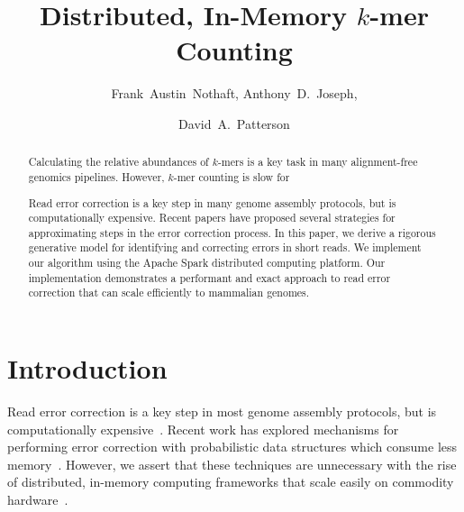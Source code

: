 \documentclass{llncs}
\begin{document}
%
\frontmatter          %
%
\pagestyle{headings}  %
\mainmatter              %
%
\title{Distributed, In-Memory $k$-mer Counting}
%
%
\author{Frank~Austin~Nothaft, Anthony~D.~Joseph, \and David~A.~Patterson}
%
%

\maketitle              %

\begin{abstract}
Calculating the relative abundances of $k$-mers is a key task in many alignment-free genomics
pipelines. However, $k$-mer counting is slow for 

Read error correction is a key step in many genome assembly protocols, but is computationally
expensive. Recent papers have proposed several strategies for approximating steps in the error
correction process. In this paper, we derive a rigorous generative model for identifying and correcting
errors in short reads. We implement our algorithm using the Apache Spark distributed computing
platform. Our implementation demonstrates a performant and exact approach to read error correction
that can scale efficiently to mammalian genomes.

\end{abstract}

\section{Introduction}
\label{sec:introduction}

Read error correction is a key step in most genome assembly protocols, but is computationally
expensive~\cite{kelley10}. Recent work has explored mechanisms for performing error correction with
probabilistic data structures which consume less memory~\cite{song14,shi10,liu13,heo14}. However,
we assert that these techniques are unnecessary with the rise of distributed, in-memory computing
frameworks that scale easily on commodity hardware~\cite{zaharia10}.
\end{document}
